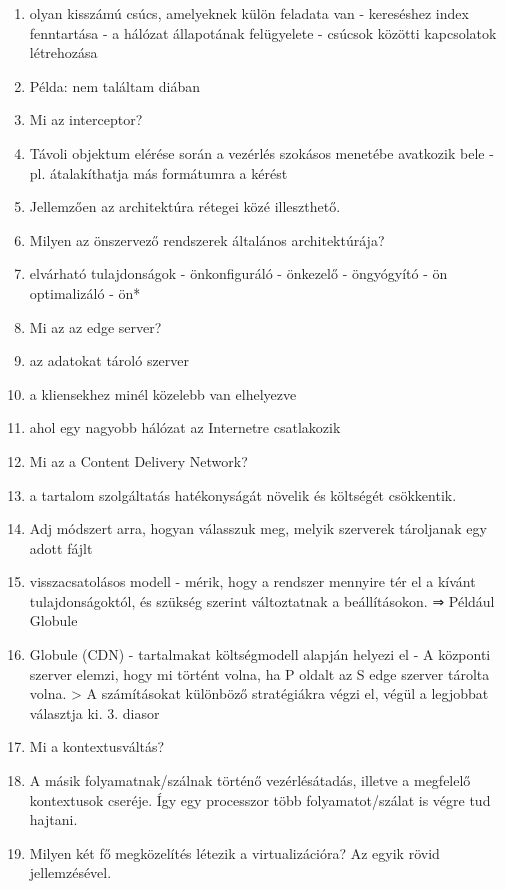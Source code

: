 \documentclass[twoside, a4paper, 12pt]{article}
\begin{document}
\begin{enumerate}
    \item olyan kisszámú csúcs, amelyeknek külön feladata van
        - kereséshez index fenntartása
        - a hálózat állapotának felügyelete
        - csúcsok közötti kapcsolatok létrehozása
    \item Példa: nem találtam diában
    \item  Mi az interceptor?
    \item Távoli objektum elérése során a vezérlés szokásos menetébe avatkozik bele
        - pl. átalakíthatja más formátumra a kérést
    \item Jellemzően az architektúra rétegei közé illeszthető.
    \item  Milyen az önszervező rendszerek általános architektúrája?
    \item elvárható tulajdonságok
        - önkonfiguráló
        - önkezelő
        - öngyógyító
        - ön optimalizáló
        - ön*
    \item Mi az az edge server?
    \item az adatokat tároló szerver
    \item a kliensekhez minél közelebb van elhelyezve
    \item ahol egy nagyobb hálózat az Internetre csatlakozik
    \item Mi az a  Content Delivery Network?
    \item a tartalom szolgáltatás hatékonyságát növelik és költségét csökkentik.
    \item Adj módszert arra, hogyan válasszuk meg, melyik szerverek tároljanak egy adott fájlt
    \item visszacsatolásos modell
        - mérik, hogy a rendszer mennyire tér el a kívánt tulajdonságoktól, és szükség szerint változtatnak a
        beállításokon. ⇒ Például Globule
    \item Globule (CDN)
        - tartalmakat költségmodell alapján helyezi el
        - A központi szerver elemzi, hogy mi történt volna, ha P oldalt az S edge szerver tárolta volna.
        > A számításokat különböző stratégiákra végzi el, végül a legjobbat választja ki.
        3. diasor
    \item  Mi a kontextusváltás?
    \item A másik folyamatnak/szálnak történő  vezérlésátadás, illetve a megfelelő kontextusok cseréje. Így egy
        processzor több folyamatot/szálat is végre tud hajtani.
    \item  Milyen két fő megközelítés létezik a virtualizációra? Az egyik rövid jellemzésével.

\end{enumerate}
\end{document}
